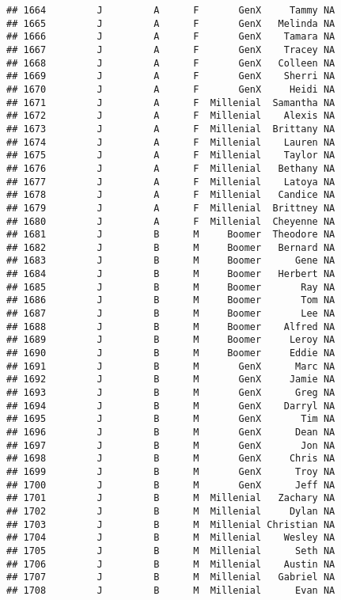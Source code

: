 \documentclass[
]{article}
\begin{document}
\begin{verbatim}
## 1664         J         A      F       GenX     Tammy NA
## 1665         J         A      F       GenX   Melinda NA
## 1666         J         A      F       GenX    Tamara NA
## 1667         J         A      F       GenX    Tracey NA
## 1668         J         A      F       GenX   Colleen NA
## 1669         J         A      F       GenX    Sherri NA
## 1670         J         A      F       GenX     Heidi NA
## 1671         J         A      F  Millenial  Samantha NA
## 1672         J         A      F  Millenial    Alexis NA
## 1673         J         A      F  Millenial  Brittany NA
## 1674         J         A      F  Millenial    Lauren NA
## 1675         J         A      F  Millenial    Taylor NA
## 1676         J         A      F  Millenial   Bethany NA
## 1677         J         A      F  Millenial    Latoya NA
## 1678         J         A      F  Millenial   Candice NA
## 1679         J         A      F  Millenial  Brittney NA
## 1680         J         A      F  Millenial  Cheyenne NA
## 1681         J         B      M     Boomer  Theodore NA
## 1682         J         B      M     Boomer   Bernard NA
## 1683         J         B      M     Boomer      Gene NA
## 1684         J         B      M     Boomer   Herbert NA
## 1685         J         B      M     Boomer       Ray NA
## 1686         J         B      M     Boomer       Tom NA
## 1687         J         B      M     Boomer       Lee NA
## 1688         J         B      M     Boomer    Alfred NA
## 1689         J         B      M     Boomer     Leroy NA
## 1690         J         B      M     Boomer     Eddie NA
## 1691         J         B      M       GenX      Marc NA
## 1692         J         B      M       GenX     Jamie NA
## 1693         J         B      M       GenX      Greg NA
## 1694         J         B      M       GenX    Darryl NA
## 1695         J         B      M       GenX       Tim NA
## 1696         J         B      M       GenX      Dean NA
## 1697         J         B      M       GenX       Jon NA
## 1698         J         B      M       GenX     Chris NA
## 1699         J         B      M       GenX      Troy NA
## 1700         J         B      M       GenX      Jeff NA
## 1701         J         B      M  Millenial   Zachary NA
## 1702         J         B      M  Millenial     Dylan NA
## 1703         J         B      M  Millenial Christian NA
## 1704         J         B      M  Millenial    Wesley NA
## 1705         J         B      M  Millenial      Seth NA
## 1706         J         B      M  Millenial    Austin NA
## 1707         J         B      M  Millenial   Gabriel NA
## 1708         J         B      M  Millenial      Evan NA

\end{verbatim}
\end{document}
